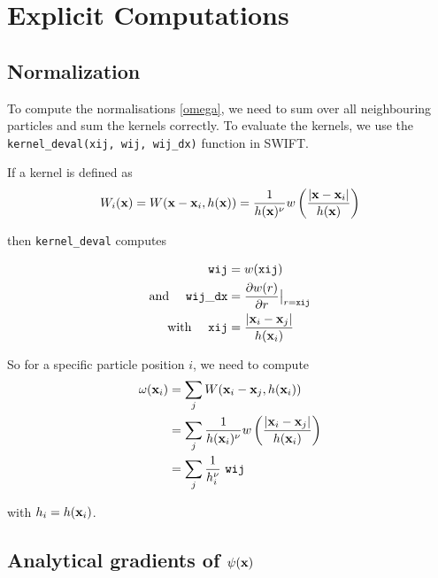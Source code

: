 \section{Explicit Computations}





\subsection{Normalization}


To compute the normalisations \ref{omega}, we need to sum over all neighbouring particles and sum the kernels correctly.
To evaluate the kernels, we use the \verb|kernel_deval(xij, wij, wij_dx)| function in SWIFT.

If a kernel is defined as
\begin{align*}
	W_i(\mathbf{x}) = W(\mathbf{x} - \mathbf{x}_i, h(\mathbf{x})) = \frac{1}{h(\mathbf{x})^\nu} w\left(\frac{| \mathbf{x} - \mathbf{x}_i |}{h(\mathbf{x})} \right)
\end{align*}

then \verb|kernel_deval| computes 

\begin{align*}
	\mathtt{wij} &= w(\mathtt{xij}) \\
	\text{and \quad} \mathtt{wij\_dx} &= \frac{\partial w(r)}{\partial r} \big{|} _{r = \mathtt{xij}} \\ 
	\text{with \quad} \mathtt{xij} &= \frac{| \mathbf{x}_i - \mathbf{x}_j |}{h(\mathbf{x}_i)}
\end{align*}



So for a specific particle position $i$, we need to compute
\begin{align*}
	\omega(\x_i) 	&= \sum_j W(\x_i - \x_j, h(\x_i)) \\
					&= \sum_j \frac{1}{h(\x_i)^\nu} w\left( \frac{| \x_i - \x_j |}{h(\x_i)} \right) \\
					&= \sum_j \frac{1}{h_i^\nu} \ \mathtt{ wij }
\end{align*}


with $h_i = h(\mathbf{x}_i)$.








\subsection{Analytical gradients of $\psi(\mathbf{x})$}


